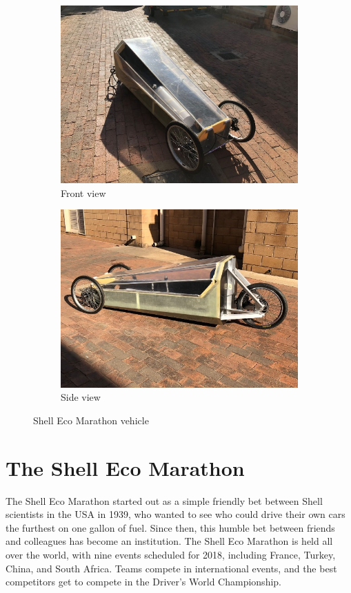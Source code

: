 \documentclass[a4paper, 12pt]{article}
\begin{document}
		\begin{figure}[H]
			\begin{subfigure}{0.5\textwidth}
				\includegraphics{img/front_view.jpg}
				\caption{Front view}
			\end{subfigure}
			\begin{subfigure}{0.5\textwidth}
				\includegraphics{img/side_view.jpg}
				\caption{Side view}
			\end{subfigure}
			\caption{Shell Eco Marathon vehicle}
		\end{figure}
	\newpage
	\section{The Shell Eco Marathon} %
	\label{sec:the_shell_eco_marathon}
		The Shell Eco Marathon started out as a simple friendly bet between Shell scientists in the USA in 1939, who wanted to see who could drive their own cars the furthest on one gallon of fuel. Since then, this humble bet between friends and colleagues has become an institution. The Shell Eco Marathon is held all over the world, with nine events scheduled for 2018, including France, Turkey, China, and South Africa. Teams compete in international events, and the best competitors get to compete in the Driver's World Championship.
\end{document}
